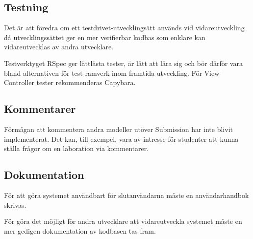 \subsection{Testning}

Det är att föredra om ett testdrivet-utvecklingsätt används vid vidareutveckling då utvecklingssättet ger en mer verifierbar kodbas som enklare kan vidareutvecklas av andra utvecklare.

Testverktyget RSpec ger lättlästa tester, är lätt att lära sig och bör därför vara bland alternativen för test-ramverk inom framtida utveckling. För View-Controller tester rekommenderas Capybara.



\subsection{Kommentarer}
Förmågan att kommentera andra modeller utöver Submission har inte blivit implementerat. Det kan, till exempel, vara av intresse för studenter att kunna ställa frågor om en laboration via kommentarer. 

\subsection{Dokumentation}
För att göra systemet användbart för slutanvändarna måste en användarhandbok skrivas. 

För göra det möjligt för andra utvecklare att vidareutveckla systemet måste en mer gedigen dokumentation av kodbasen tas fram.
